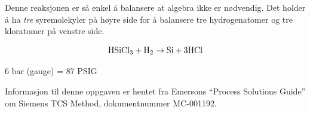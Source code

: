Denne reaksjonen er så enkel å balansere at algebra ikke er nødvendig. Det holder å ha {\it tre} syremolekyler på høyre side for å balansere tre hydrogenatomer og tre kloratomer på venstre side.

$$\hbox{HSiCl}_3 + \hbox{H}_2 \rightarrow \hbox{Si} + 3\hbox{HCl}$$

\vskip 10pt

6 bar (gauge) = 87 PSIG

\vskip 10pt

Informasjon til denne oppgaven er hentet fra Emersons ``Process Solutions Guide'' om Siemens TCS Method, dokumentnummer MC-001192.



